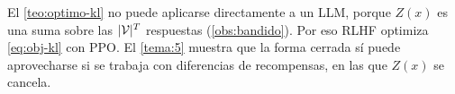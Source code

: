 El \cref{teo:optimo-kl} no puede aplicarse directamente a un LLM, porque $Z(x)$ es una suma sobre las $\lvert\mathcal{V}\rvert^{T}$ respuestas (\cref{obs:bandido}). Por eso RLHF optimiza \eqref{eq:obj-kl} con PPO. El \cref{tema:5} muestra que la forma cerrada sí puede aprovecharse si se trabaja con diferencias de recompensas, en las que $Z(x)$ se cancela.

